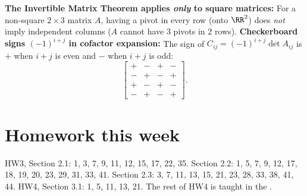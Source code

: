 \documentclass[10pt]{scrartcl}
\begin{document}
\begin{trapbox}
  \ii \textbf{The Invertible Matrix Theorem applies \emph{only} to square matrices:} For a non-square $2\times 3$ matrix $A$, having a pivot in every row (onto $\RR^2$) does \emph{not} imply independent columns ($A$ cannot have $3$ pivots in $2$ rows).
  \ii \textbf{Checkerboard signs $(-1)^{i+j}$ in cofactor expansion:} The sign of $C_{ij}=(-1)^{i+j}\det A_{ij}$ is $+$ when $i+j$ is even and $-$ when $i+j$ is odd:
  \[
    \begin{bmatrix} + & - & + & - \\ - & + & - & + \\ + & - & + & - \\ - & + & - & + \end{bmatrix}.
  \]
\end{trapbox}

\section{Homework this week}
HW3, Section 2.1: 1, 3, 7, 9, 11, 12, 15, 17, 22, 35. Section 2.2: 1, 5, 7, 9, 12, 17, 18, 19, 20, 23, 29, 31, 33, 41. Section 2.3: 3, 7, 11, 13, 15, 21, 23, 28, 33, 38, 41, 44. HW4, Section 3.1: 1, 5, 11, 13, 21. The rest of HW4 is taught in the .
\end{document}
